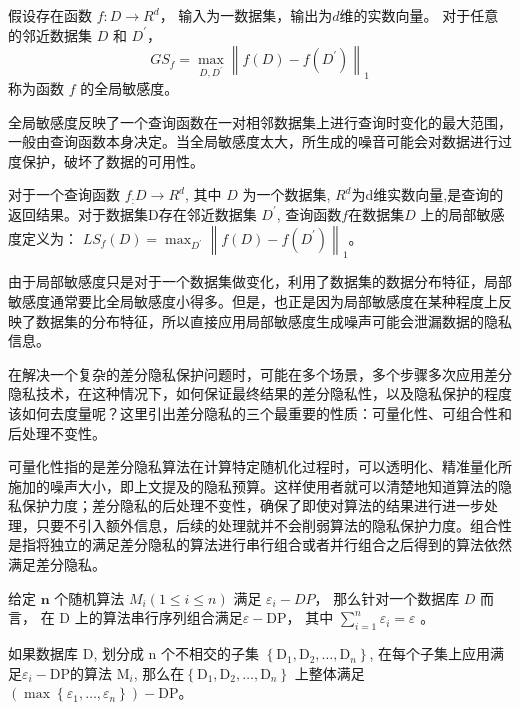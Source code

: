 \begin{define}[全局敏感度]\label{全局敏感度}
假设存在函数 $f: D \rightarrow R^{d}$， 输入为一数据集，输出为$d$维的实数向量。 对于任意的邻近数据集 $D$ 和 $D^{\prime}$，
$$
G S_{f}=\max _{D, D^{\prime}}\left\|f(D)-f\left(D^{\prime}\right)\right\|_{1}
$$
称为函数 $f$ 的全局敏感度。
\end{define}

全局敏感度反映了一个查询函数在一对相邻数据集上进行查询时变化的最大范围，一般由查询函数本身决定。当全局敏感度太大，所生成的噪音可能会对数据进行过度保护，破坏了数据的可用性。

\begin{define}[局部敏感度]\label{局部敏感度}
对于一个查询函数 $f_{:} D \rightarrow R^{d}$, 其中 $D$ 为一个数据集, $R^{d}$为d维实数向量,是查询的返回结果。对于数据集D存在邻近数据集 $D^{\prime}$, 查询函数$f$在数据集$D$ 上的局部敏感度定义为：
$L S_{f}(D)=\max _{D^{\prime}}\left\|f(D)-f\left(D^{\prime}\right)\right\|_{1}$。
\end{define}

由于局部敏感度只是对于一个数据集做变化，利用了数据集的数据分布特征，局部敏感度通常要比全局敏感度小得多。但是，也正是因为局部敏感度在某种程度上反映了数据集的分布特征，所以直接应用局部敏感度生成噪声可能会泄漏数据的隐私信息。

在解决一个复杂的差分隐私保护问题时，可能在多个场景，多个步骤多次应用差分隐私技术，在这种情况下，如何保证最终结果的差分隐私性，以及隐私保护的程度该如何去度量呢？这里引出差分隐私的三个最重要的性质：可量化性、可组合性和后处理不变性。

可量化性指的是差分隐私算法在计算特定随机化过程时，可以透明化、精准量化所施加的噪声大小，即上文提及的隐私预算。这样使用者就可以清楚地知道算法的隐私保护力度；差分隐私的后处理不变性，确保了即使对算法的结果进行进一步处理，只要不引入额外信息，后续的处理就并不会削弱算法的隐私保护力度。组合性是指将独立的满足差分隐私的算法进行串行组合或者并行组合之后得到的算法依然满足差分隐私。

\begin{theorem}[串行组合]\label{串行组合}
给定 $\mathbf{n}$ 个随机算法 $M_{i}(1 \leq i \leq n)$ 满足 $\varepsilon_{i}-DP$， 那么针对一个数据库 $D$ 而言， 在 $\mathrm{D}$ 上的算法串行序列组合满足$\varepsilon-\mathrm{DP}$， 其中 $\sum_{i=1}^{n} \varepsilon_{i}=\varepsilon$ 。
\end{theorem}

\begin{theorem}[并行组合]\label{并行组合}
如果数据库 $\mathrm{D}$, 划分成 $\mathrm{n}$ 个不相交的子集 $\left\{\mathrm{D}_{1}, \mathrm{D}_{2}, \ldots, \mathrm{D}_{n}\right\}$, 在每个子集上应用满足$\varepsilon_{i}-\mathrm{DP}$的算法 $\mathrm{M}_{i}$,  那么在$\left\{\mathrm{D}_{1}, \mathrm{D}_{2}, \ldots, \mathrm{D}_{n}\right\}$ 上整体满足 $\left(\max \left\{\varepsilon_{1}, \ldots, \varepsilon_{n}\right\}\right)-\mathrm{DP}$。
\end{theorem}

